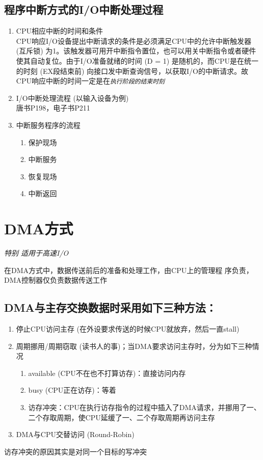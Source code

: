 \documentclass[]{report}
\begin{document}
			\subsection[]{程序中断方式的I/O中断处理过程}
				\begin{enumerate}
					\item CPU相应中断的时间和条件\\
					CPU响应I/O设备提出中断请求的条件是必须满足CPU中的允许中断触发器 (互斥锁) 为\textsf{1}。该触发器可用开中断指令置位，也可以用关中断指令或者硬件使其自动复位。由于I/O准备就绪的时间 (D = 1) 是随机的，而CPU是在统一的时刻 (EX段结束前) 向接口发中断查询信号，以获取I/O的中断请求。故CPU响应中断的时间一定是在\texttt{\textit{执行阶段的结束时刻}}
					\item I/O中断处理流程 (以输入设备为例)\\
					唐书P198，电子书P211
					\item 中断服务程序的流程
					\begin{enumerate}
						\item 保护现场
						\item 中断服务
						\item 恢复现场
						\item 中断返回
					\end{enumerate}
				\end{enumerate}
		\section{DMA方式}
			\textit{特别 适用于高速I/O}\par
			在DMA方式中，数据传送前后的准备和处理工作，由CPU上的管理程 序负责，DMA控制器仅负责数据传送工作\par
			\subsection{DMA与主存交换数据时采用如下三种方法：}\par
			\begin{enumerate}
				\item 停止CPU访问主存 (在外设要求传送的时候CPU就放弃，然后一直stall)
				\item 周期挪用/周期窃取 (读书人的事)；当DMA要求访问主存时，分为如下三种情况\par
				\begin{enumerate}
					\item available (CPU不在也不打算访存)：直接访问内存
					\item busy (CPU正在访存)：等着
					\item 访存冲突：CPU在执行访存指令的过程中插入了DMA请求，并挪用了一、二个存取周期，使CPU延缓了一、二个存取周期再访问主存
				\end{enumerate}
				\item DMA与CPU交替访问 (Round-Robin)
			\end{enumerate}
			访存冲突的原因其实是对同一个目标的写冲突
\end{document}
